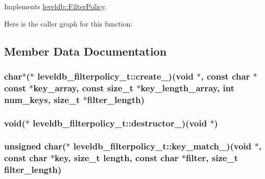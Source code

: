 Implements \hyperlink{classleveldb_1_1_filter_policy_afd5e951892a2e740f186c0658913ea1b}{leveldb\-::\-Filter\-Policy}.



Here is the caller graph for this function\-:




\subsection{Member Data Documentation}
\hypertarget{structleveldb__filterpolicy__t_a7135a30801b44a977db41404df3a11c1}{
\subsubsection[{create\-\_\-}]{\setlength{\rightskip}{0pt plus 5cm}char$\ast$($\ast$ leveldb\-\_\-filterpolicy\-\_\-t\-::create\-\_\-)(void $\ast$, const char $\ast$const $\ast$key\-\_\-array, const size\-\_\-t $\ast$key\-\_\-length\-\_\-array, int num\-\_\-keys, size\-\_\-t $\ast$filter\-\_\-length)}}\label{structleveldb__filterpolicy__t_a7135a30801b44a977db41404df3a11c1}
\hypertarget{structleveldb__filterpolicy__t_a4d73739bd834e5c7364a91e1a0a377ed}{
\subsubsection[{destructor\-\_\-}]{\setlength{\rightskip}{0pt plus 5cm}void($\ast$ leveldb\-\_\-filterpolicy\-\_\-t\-::destructor\-\_\-)(void $\ast$)}}\label{structleveldb__filterpolicy__t_a4d73739bd834e5c7364a91e1a0a377ed}
\hypertarget{structleveldb__filterpolicy__t_a78bd1d4fbf62e505b921bb0e1bcf38f1}{
\subsubsection[{key\-\_\-match\-\_\-}]{\setlength{\rightskip}{0pt plus 5cm}unsigned char($\ast$ leveldb\-\_\-filterpolicy\-\_\-t\-::key\-\_\-match\-\_\-)(void $\ast$, const char $\ast$key, size\-\_\-t length, const char $\ast$filter, size\-\_\-t filter\-\_\-length)}}\label{structleveldb__filterpolicy__t_a78bd1d4fbf62e505b921bb0e1bcf38f1}
